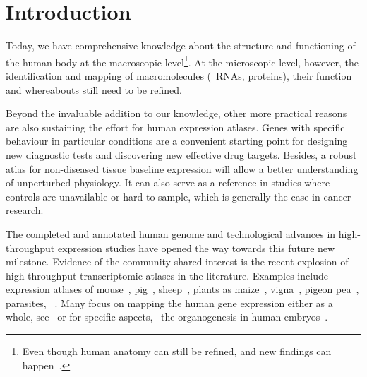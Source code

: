 \chapter*{Introduction}\label{ch:intro}

\setlength{\epigraphwidth}{0.62\textwidth}
\setlength{\epigraphrule}{0pt}

\vspace{-4mm}

Today, we have comprehensive knowledge %
about the structure and functioning of the human body
at the macroscopic level\footnote{%
Even though human anatomy can still be refined,
and new findings can happen~.}.
At the microscopic level, however,
the identification and mapping of macromolecules
(\eg\ \glspl{RNA},  proteins),
their function and whereabouts still need to be refined.\mybr\

Beyond the invaluable addition to our knowledge,
other more practical reasons are also sustaining the effort
for human expression atlases.
Genes with specific behaviour in particular conditions
are a convenient starting point
for designing new diagnostic tests
and discovering new effective drug targets.
Besides, a robust atlas for non-diseased tissue baseline expression
will allow a better understanding of unperturbed physiology.
It can also serve as a reference in studies where controls are unavailable
or hard to sample,
which is generally the case in cancer research.\mybr\

The completed and annotated human genome and
technological advances in high-throughput expression studies
have opened the way towards this future new milestone.
Evidence of the community shared interest is
the recent explosion of high-throughput transcriptomic atlases in the literature.
Examples include expression atlases of
mouse~, pig~,
sheep~, plants as maize~,
vigna~, pigeon pea~,
parasites, \eg\ .
Many focus on mapping the human gene expression either as a whole,
see~\eg{} 
or for specific aspects,
\eg\ the organogenesis in human embryos~.\mybr\

